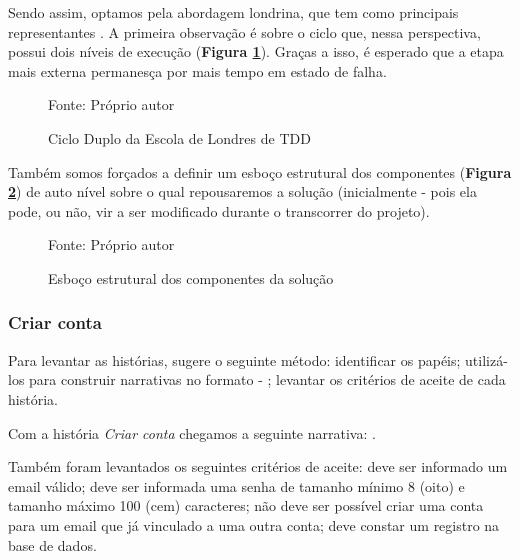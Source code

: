  Sendo assim, optamos pela abordagem londrina, que tem como principais
  representantes . A primeira observação é sobre o
  ciclo que, nessa perspectiva, possui dois níveis de execução (\textbf{Figura \ref{fig:ciclo-atdd}}). Graças a isso, é esperado que a etapa mais externa permanesça por mais tempo em estado de falha.

  \begin{figure}[h]
    \centering
    \caption{Ciclo Duplo da Escola de Londres de TDD}
    Fonte: Próprio autor\footnotemark
    \label{fig:ciclo-atdd}
  \end{figure}

   Também somos forçados a definir um esboço estrutural dos componentes (\textbf{Figura \ref{fig:esboco-estrutural}}) de auto nível sobre o qual repousaremos a solução (inicialmente - pois ela pode, ou não, vir a ser modificado durante o transcorrer do projeto).

  \begin{figure}[h]
    \centering
    \caption{Esboço estrutural dos componentes da solução}
    Fonte: Próprio autor
    \label{fig:esboco-estrutural}
  \end{figure}

  \subsubsection{Criar conta}

    Para levantar as histórias,  sugere o seguinte método: identificar os papéis; utilizá-los para construir narrativas no formato - ; levantar os critérios de aceite de cada história.

    Com a história \emph{Criar conta} chegamos a seguinte narrativa: .

    Também foram levantados os seguintes critérios de aceite: deve ser informado um email válido; deve ser informada uma senha de tamanho mínimo 8 (oito) e tamanho máximo 100 (cem) caracteres; não deve ser possível criar uma conta para um email que já vinculado a uma outra conta; deve constar um registro na base de dados.


